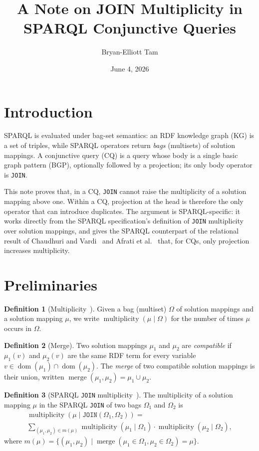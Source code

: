 \documentclass[11pt]{article}
\title{A Note on JOIN Multiplicity in SPARQL Conjunctive Queries}
\author{Bryan-Elliott Tam}
\date{June 4, 2026}
\theoremstyle{plain}
\theoremstyle{definition}
\newtheorem{definition}{Definition}
\begin{document}
\maketitle

\section{Introduction}

SPARQL is evaluated under bag-set semantics: an RDF knowledge graph (KG) is a set of triples, while SPARQL operators return \emph{bags} (multisets) of solution mappings.
A conjunctive query (CQ) is a query whose body is a single basic graph pattern (BGP), optionally followed by a projection; its only body operator is \texttt{JOIN}.

This note proves that, in a CQ, \texttt{JOIN} cannot raise the multiplicity of a solution mapping above one.
Within a CQ, projection at the head is therefore the only operator that can introduce duplicates.
The argument is SPARQL-specific: it works directly from the SPARQL specification's definition of \texttt{JOIN} multiplicity~\cite{w3SPARQLQuery} over solution mappings, and gives the SPARQL counterpart of the relational result of Chaudhuri and Vardi~\cite{Chaudhuri1993} and Afrati et al.~\cite{Afrati2010} that, for CQs, only projection increases multiplicity.

\section{Preliminaries}

\begin{definition}[Multiplicity~\cite{w3SPARQLQuery}]\label{def_multiplicity}
Given a bag (multiset) $\Omega$ of solution mappings and a solution mapping $\mu$, we write $\operatorname{multiplicity}(\mu \mid \Omega)$ for the number of times $\mu$ occurs in $\Omega$.
\end{definition}

\begin{definition}[Merge]\label{def_merge}
Two solution mappings $\mu_1$ and $\mu_2$ are \emph{compatible} if $\mu_1(v)$ and $\mu_2(v)$ are the same RDF term for every variable $v \in \operatorname{dom}(\mu_1) \cap \operatorname{dom}(\mu_2)$.
The \emph{merge} of two compatible solution mappings is their union, written $\operatorname{merge}(\mu_1, \mu_2) = \mu_1 \cup \mu_2$.
\end{definition}

\begin{definition}[SPARQL \texttt{JOIN} multiplicity~\cite{w3SPARQLQuery}]\label{def_join_multiplicity}
The multiplicity of a solution mapping $\mu$ in the SPARQL \texttt{JOIN} of two bags $\Omega_1$ and $\Omega_2$ is
\begin{multline*}
\operatorname{multiplicity}(\mu \mid \texttt{JOIN}(\Omega_1, \Omega_2)) = \\
\sum_{(\mu_1, \mu_2) \in m(\mu)} \operatorname{multiplicity}(\mu_1 \mid \Omega_1) \cdot \operatorname{multiplicity}(\mu_2 \mid \Omega_2),
\end{multline*}
where $m(\mu) = \{(\mu_1, \mu_2) \mid \operatorname{merge}(\mu_1 \in \Omega_1, \mu_2 \in \Omega_2) = \mu\}$.
\end{definition}
\end{document}
